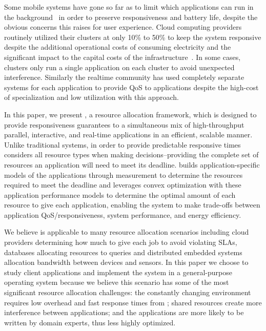 Some mobile systems have gone so far as to limit which applications can run in the background~\cite{iOsDev} in order to preserve responsiveness and battery life, despite the obvious concerns this raises for user experience.  Cloud computing providers routinely utilized their clusters at only 10\% to 50\% to keep the system responsive despite the additional operational costs of consuming electricity and the significant impact to the capital costs of the infrastructure~\cite{Barroso2009,Hennessy2011}.   In some cases, clusters only run a single application on each cluster to avoid unexpected interference.  Similarly the realtime community has used completely separate systems for each application to provide QoS to applications despite the high-cost of specialization and low utilization with this approach.

In this paper, we present \pacora, a resource allocation framework, which is designed to provide responsiveness guarantees to a simultaneous mix of high-throughput parallel, interactive, and real-time applications in an efficient, scalable manner.  Unlike traditional systems, in order to provide predictable responsive times \pacora considers all resource types when making decisions--providing the complete set of resources an application will need to meet its deadline.   \pacora builds application-specific models of the applications through measurement to determine the resources required to meet the deadline and leverages convex optimization with these application performance models to determine the optimal amount of each resource to give each application, enabling the system to make trade-offs between application QoS/responsiveness, system performance, and energy efficiency. 

We believe \pacora is applicable to many resource allocation scenarios including cloud providers determining how much to give each job to avoid violating SLAs, databases allocating resources to queries and distributed embedded systems allocation bandwidth between devices and sensors.  In this paper we choose to study client applications and implement the system in a general-purpose operating system because we believe this scenario has some of the most significant resource allocation challenges: the constantly changing environment requires low overhead and fast response times from \pacora;  shared resources create more interference between applications; and the applications are more likely to be written by domain experts, thus less highly optimized.


